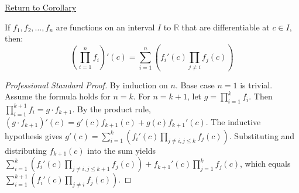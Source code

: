 \newpage
{}
\label{prf:finite-product-rule}

\begin{remark*}[Return]
\hyperref[cor:extended-product-rule]{Return to Corollary}
\end{remark*}

\begin{corollary*}
If $f_1, f_2, \ldots, f_n$ are functions on an interval $I$ to $\mathbb{R}$ that are differentiable at $c \in I$, then:
\[ \left( \prod_{i=1}^{n} f_i \right)'(c) = \sum_{i=1}^{n} \left( f_i'(c) \prod_{j \neq i} f_j(c) \right) \]
\end{corollary*}

\begin{proof}[Professional Standard Proof]
\LRAProofBodyStart
By induction on $n$. Base case $n=1$ is trivial. Assume the formula holds for $n=k$. For $n=k+1$, let $g = \prod_{i=1}^{k} f_i$. Then $\prod_{i=1}^{k+1} f_i = g \cdot f_{k+1}$. By the product rule, $(g \cdot f_{k+1})'(c) = g'(c)f_{k+1}(c) + g(c)f_{k+1}'(c)$. The inductive hypothesis gives $g'(c) = \sum_{i=1}^{k} \left( f_i'(c) \prod_{j \neq i, j \leq k} f_j(c) \right)$. Substituting and distributing $f_{k+1}(c)$ into the sum yields $\sum_{i=1}^{k} \left( f_i'(c) \prod_{j \neq i, j \leq k+1} f_j(c) \right) + f_{k+1}'(c) \prod_{j=1}^{k} f_j(c)$, which equals $\sum_{i=1}^{k+1} \left( f_i'(c) \prod_{j \neq i} f_j(c) \right)$.
\end{proof}

